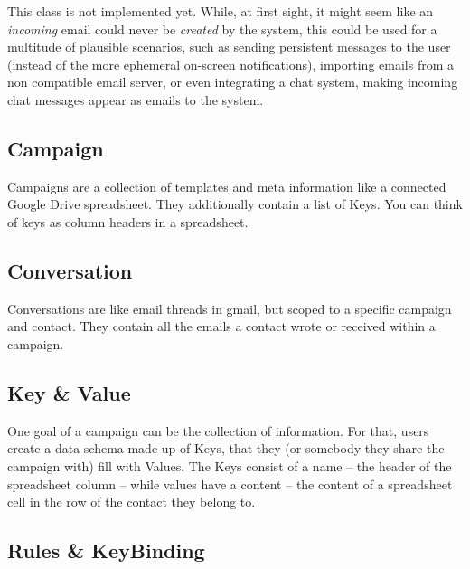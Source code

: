 This class is not implemented yet. While, at first sight, it might seem like an \emph{incoming} email could never be \emph{created} by the system, this could be used for a multitude of plausible scenarios, such as sending persistent messages to the user (instead of the more ephemeral on-screen notifications), importing emails from a non  compatible email server, or even integrating a chat system, making incoming chat messages appear as emails to the system.

\subsection{Campaign}

Campaigns are a collection of templates and meta information like a connected Google Drive spreadsheet. They additionally contain a list of Keys. You can think of keys as column headers in a spreadsheet.

\subsection{Conversation}

Conversations are like email threads in gmail, but scoped to a specific campaign and contact. They contain all the emails a contact wrote or received within a campaign.

\subsection{Key \& Value}


One goal of a campaign can be the collection of information. For that, users create a data schema made up of Keys, that they (or somebody they share the campaign with) fill with Values. The Keys consist of a name – the header of the spreadsheet column – while values have a content – the content of a spreadsheet cell in the row of the contact they belong to.
\pagebreak
\subsection{Rules \& KeyBinding}


